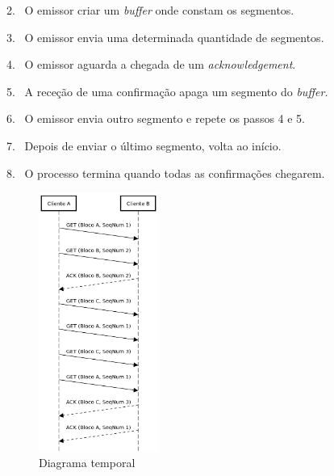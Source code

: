         \hspace{4.5pt}2.~ O emissor criar um \textit{buffer} onde constam os segmentos.
            
        \hspace{4.5pt}3.~ O emissor envia uma determinada quantidade de segmentos.
        
        \hspace{4.5pt}4.~ O emissor aguarda a chegada de um \textit{acknowledgement}.

        \hspace{4.5pt}5.~ A receção de uma confirmação apaga um segmento do \textit{buffer.}

        \hspace{4.5pt}6.~ O emissor envia outro segmento e repete os passos 4 e 5.

        \hspace{4.5pt}7.~ Depois de enviar o último segmento, volta ao início.

        \hspace{4.5pt}8.~ O processo termina quando todas as confirmações chegarem.

        \begin{figure}
            \begin{center}
                \vspace{-25pt}
                \includegraphics[width=0.35\textwidth]{Imagens/Diagramas Temporais/udp.png}
                \caption{Diagrama temporal}
                \vspace{-50pt}
            \end{center}
        \end{figure}

